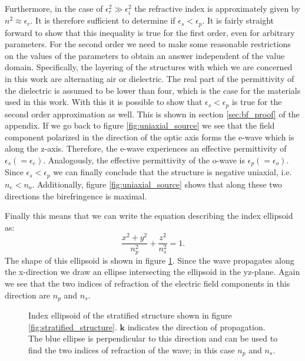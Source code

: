 Furthermore, in the case of $\epsilon_r^2 \gg \epsilon_i^2$ the refractive index is approximately given by $n^2 \approx \epsilon_r$. It is therefore sufficient to determine if $\epsilon_{s} < \epsilon_{p}$. It is fairly straight forward to show that this inequality is true for the first order, even for arbitrary parameters. For the second order we need to make some reasonable restrictions on the values of the parameters to obtain an answer independent of the value domain. Specifically, the layering of the structures with which we are concerned in this work are alternating air or dielectric. The real part of the permittivity of the dielectric is assumed to be lower than four, which is the case for the materials used in this work. With this it is possible to show that $\epsilon_{s} < \epsilon_{p}$ is true for the second order approximation as well. This is shown in section \ref{sec:bf_proof} of the appendix. If we go back to figure \ref{fig:uniaxial_source} we see that the field component polarized in the direction of the optic axis forms the e-wave which is along the z-axis. Therefore, the e-wave experiences an effective permittivity of $\epsilon_{s}(=\epsilon_{e})$. Analogously, the effective permittivity of the o-wave is $\epsilon_{p}(=\epsilon_{o})$. Since $\epsilon_{s} < \epsilon_{p}$ we can finally conclude that the structure is negative uniaxial, i.e. $n_e < n_o$. Additionally, figure \ref{fig:uniaxial_source} shows that along these two directions the birefringence is maximal. 

Finally this means that we can write the equation describing the index ellipsoid as:
\begin{equation}
    \frac{x^2+y^2}{n_p^2}+\frac{z^2}{n_s^2}=1.
\end{equation}
The shape of this ellipsoid is shown in figure \ref{fig:index_ellipse}. Since the wave propagates along the x-direction we draw an ellipse intersecting the ellipsoid in the yz-plane. Again we see that the two indices of refraction of the electric field components in this direction are $n_{p}$ and $n_{s}$. 
\begin{figure}[h]
    \centering
    
    \caption{Index ellipsoid of the stratified structure shown in figure \ref{fig:stratified_structure}. $\bm{k}$ indicates the direction of propagation. The blue ellipse is perpendicular to this direction and can be used to find the two indices of refraction of the wave; in this case $n_{p}$ and $n_{s}$.}
    \label{fig:index_ellipse}
\end{figure}

